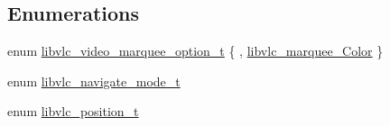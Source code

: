 \subsection*{Enumerations}
\begin{DoxyCompactItemize}
\item 
enum \hyperlink{group__libvlc__media__player_ga412d5b45da5bda967f656cb17ecc83fd}{libvlc\+\_\+video\+\_\+marquee\+\_\+option\+\_\+t} \{ , \hyperlink{group__libvlc__media__player_gga412d5b45da5bda967f656cb17ecc83fda46d8b92b1bf73d727e5f9fad4bb9ee2d}{libvlc\+\_\+marquee\+\_\+\+Color}
 \}
\item 
enum \hyperlink{group__libvlc__media__player_ga6e6b601e219aafd4ffc6063c1dbf11b1}{libvlc\+\_\+navigate\+\_\+mode\+\_\+t} 
\item 
enum \hyperlink{group__libvlc__media__player_ga948997d1c6ab5fee8051417ac7dfa1c7}{libvlc\+\_\+position\+\_\+t} 
\end{DoxyCompactItemize}
